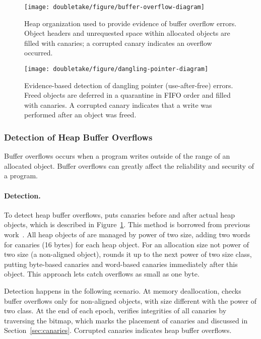 \begin{figure}[!t]
\begin{center}
\texttt{[image: doubletake/figure/buffer-overflow-diagram]}
\end{center}
\caption{Heap organization used to provide evidence of buffer overflow errors. Object headers and unrequested space within allocated objects are filled with canaries; a corrupted canary indicates an overflow occurred.
\label{fig:buffer-overflow}}
\end{figure}

\begin{figure}[!t]
\begin{center}
\texttt{[image: doubletake/figure/dangling-pointer-diagram]}
\end{center}
\caption{Evidence-based detection of dangling pointer (use-after-free) errors. Freed objects are deferred in a quarantine in FIFO order and filled with canaries. A corrupted canary indicates that a write was performed after an object was freed.
\label{fig:dangling-pointer}}
\end{figure}


\subsubsection{Detection of Heap Buffer Overflows}
\label{sec:overflow}
Buffer overflows occurs when a program writes outside of the range of an allocated object. Buffer overflows can greatly affect the reliability and security of a program. 

\paragraph{Detection.}
To detect heap buffer overflows, \DoubleTake{} puts canaries before and after actual heap objects, which is described in Figure~\ref{fig:buffer-overflow}. This method is borrowed from previous work~\cite{overflow:lbc, AddressSanitizer}.
All heap objects of \doubletake{} are managed by power of two size, adding two words for canaries (16 bytes) for each heap object. For an allocation size not power of two size (a non-aligned object), \doubletake{} rounds it up to the next power of two size class, putting byte-based canaries and word-based canaries immediately after this object. This approach lets \doubletake{} catch overflows as small as one byte. 

Detection happens in the following scenario. At memory deallocation, \doubletake{} checks buffer overflows only for non-aligned objects, with size different with the power of two class. At the end of each epoch, \doubletake{} verifies integrities of all canaries by traversing the bitmap, which marks the placement of canaries and discussed in Section~\ref{sec:canaries}.  Corrupted canaries indicates heap buffer overflows. 

